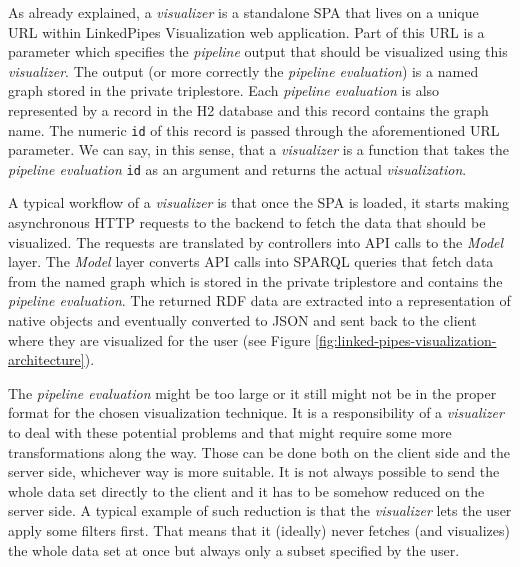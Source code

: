 As already explained, a \emph{visualizer} is a standalone SPA that lives on a unique URL within LinkedPipes Visualization web application. Part of this URL is a parameter which specifies the \emph{pipeline} output that should be visualized using this \emph{visualizer}. The output (or more correctly the \emph{pipeline evaluation}) is a named graph stored in the private triplestore. Each \emph{pipeline evaluation} is also represented by a record in the H2 database and this record contains the graph name. The numeric \texttt{id} of this record is passed through the aforementioned URL parameter. We can say, in this sense, that a \emph{visualizer} is a function that takes the \emph{pipeline evaluation} \texttt{id} as an argument and returns the actual \emph{visualization}.

A typical workflow of a \emph{visualizer} is that once the SPA is loaded, it starts making asynchronous HTTP requests to the backend to fetch the data that should be visualized. The requests are translated by controllers into API calls to the \emph{Model} layer.  The \emph{Model} layer converts API calls into SPARQL queries that fetch data from the named graph which is stored in the private triplestore and contains the \emph{pipeline evaluation}. The returned RDF data are extracted into a representation of native objects and eventually converted to JSON and sent back to the client where they are visualized for the user (see Figure \ref{fig:linked-pipes-visualization-architecture}).

The \emph{pipeline evaluation} might be too large or it still might not be in the proper format for the chosen visualization technique. It is a responsibility of a \emph{visualizer} to deal with these potential problems and that might require some more transformations along the way. Those can be done both on the client side and the server side, whichever way is more suitable. It is not always possible to send the whole data set directly to the client and it has to be somehow reduced on the server side. A typical example of such reduction is that the \emph{visualizer} lets the user apply some filters first. That means that it (ideally) never fetches (and visualizes) the whole data set at once but always only a subset specified by the user. 
